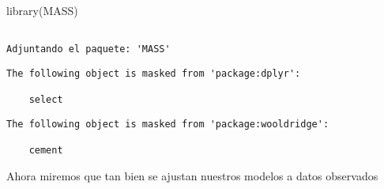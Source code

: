 \documentclass[
  letterpaper,
  DIV=11,
  numbers=noendperiod]{scrreprt}
\newenvironment{Shaded}{\begin{snugshade}}{\end{snugshade}}
\newcommand{\AttributeTok}[1]{\textcolor[rgb]{0.40,0.45,0.13}{#1}}
\newcommand{\FunctionTok}[1]{\textcolor[rgb]{0.28,0.35,0.67}{#1}}
\newcommand{\NormalTok}[1]{\textcolor[rgb]{0.00,0.23,0.31}{#1}}
\newcommand{\OtherTok}[1]{\textcolor[rgb]{0.00,0.23,0.31}{#1}}
\newcommand{\SpecialCharTok}[1]{\textcolor[rgb]{0.37,0.37,0.37}{#1}}
\begin{document}
\begin{Shaded}
\begin{Highlighting}[]
\FunctionTok{library}\NormalTok{(MASS)}
\end{Highlighting}
\end{Shaded}

\begin{verbatim}

Adjuntando el paquete: 'MASS'
\end{verbatim}

\begin{verbatim}
The following object is masked from 'package:dplyr':

    select
\end{verbatim}

\begin{verbatim}
The following object is masked from 'package:wooldridge':

    cement
\end{verbatim}

\begin{Shaded}
\end{Shaded}

Ahora miremos que tan bien se ajustan nuestros modelos a datos
observados
\end{document}
